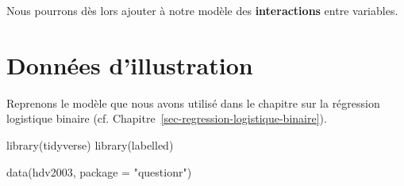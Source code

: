 \documentclass[
  letterpaper,
  DIV=11,
  numbers=noendperiod,
  oneside]{scrreprt}
\newenvironment{Shaded}{\begin{snugshade}}{\end{snugshade}}
\newcommand{\AttributeTok}[1]{\textcolor[rgb]{0.40,0.45,0.13}{#1}}
\newcommand{\FunctionTok}[1]{\textcolor[rgb]{0.28,0.35,0.67}{#1}}
\newcommand{\NormalTok}[1]{\textcolor[rgb]{0.00,0.23,0.31}{#1}}
\newcommand{\StringTok}[1]{\textcolor[rgb]{0.13,0.47,0.30}{#1}}
\begin{document}
Nous pourrons dès lors ajouter à notre modèle des \textbf{interactions}
entre variables.

\hypertarget{donnuxe9es-dillustration-1}{%
\section{Données d'illustration}\label{donnuxe9es-dillustration-1}}

Reprenons le modèle que nous avons utilisé dans le chapitre sur la
régression logistique binaire (cf.
Chapitre~\ref{sec-regression-logistique-binaire}).

\begin{Shaded}
\begin{Highlighting}[]
\FunctionTok{library}\NormalTok{(tidyverse)}
\FunctionTok{library}\NormalTok{(labelled)}

\FunctionTok{data}\NormalTok{(hdv2003, }\AttributeTok{package =} \StringTok{"questionr"}\NormalTok{)}


\end{Highlighting}
\end{Shaded}
\end{document}
